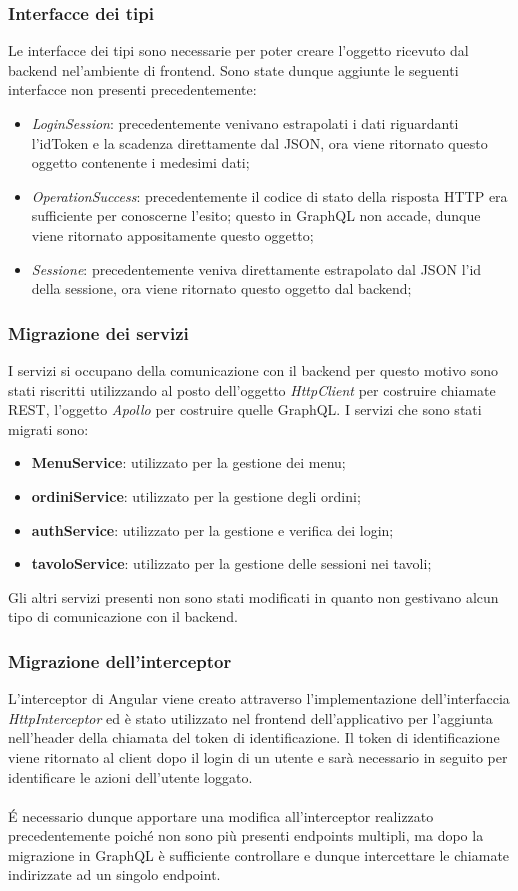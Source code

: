 \subsubsection*{Interfacce dei tipi}
Le interfacce dei tipi sono necessarie per poter creare l'oggetto ricevuto dal backend nel'ambiente di frontend. Sono state dunque aggiunte le seguenti interfacce non presenti precedentemente:
\begin{itemize}
  \item \textit{LoginSession}: precedentemente venivano estrapolati i dati riguardanti l'idToken e la scadenza direttamente dal JSON, ora viene ritornato questo oggetto contenente i medesimi dati;
  \item \textit{OperationSuccess}: precedentemente il codice di stato della risposta HTTP era sufficiente per conoscerne l'esito; questo in GraphQL non accade, dunque viene ritornato appositamente questo oggetto;
  \item \textit{Sessione}: precedentemente veniva direttamente estrapolato dal JSON l'id della sessione, ora viene ritornato questo oggetto dal backend;
\end{itemize}
\subsubsection{Migrazione dei servizi}
I servizi si occupano della comunicazione con il backend per questo motivo sono stati riscritti utilizzando al posto dell'oggetto \textit{HttpClient} per costruire chiamate REST, l'oggetto \textit{Apollo} per costruire quelle GraphQL.
I servizi che sono stati migrati sono:
\begin{itemize}
  \item \textbf{MenuService}: utilizzato per la gestione dei menu;
  \item \textbf{ordiniService}: utilizzato per la gestione degli ordini;
  \item \textbf{authService}: utilizzato per la gestione e verifica dei login;
  \item \textbf{tavoloService}: utilizzato per la gestione delle sessioni nei tavoli;
\end{itemize}
Gli altri servizi presenti non sono stati modificati in quanto non gestivano alcun tipo di comunicazione con il backend.
\subsubsection*{Migrazione dell'interceptor}
L'interceptor di Angular viene creato attraverso l'implementazione dell'interfaccia \textit{HttpInterceptor} ed è stato utilizzato nel frontend dell'applicativo per l'aggiunta nell'header della chiamata del token di identificazione. Il token di identificazione viene ritornato al client dopo il login di un utente e sarà necessario in seguito per identificare le azioni dell'utente loggato.\\ \\
É necessario dunque apportare una modifica all'interceptor realizzato precedentemente poiché non sono più presenti endpoints multipli, ma dopo la migrazione in GraphQL è sufficiente controllare e dunque intercettare le chiamate indirizzate ad un singolo endpoint.
